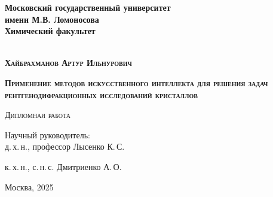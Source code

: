 \begin{titlepage}
\newpage

\begin{center}

\textbf{Московский государственный университет\\ имени М.В. Ломоносова}\\
\textbf{Химический факультет}\\
\\
\end{center}
\vspace{1cm}


\vspace{8em}
\begin{center}
\textsc{\textbf{Хайбрахманов Артур Ильнурович}}
\vspace{1cm}


\textsc{\textbf{\large Применение методов искусственного интеллекта для решения задач рентгенодифракционных исследований кристаллов}}


\vspace{1em}

\textsc{Дипломная работа}
\end{center}
\vspace{7em}
\begin{flushright}
Научный руководитель:\\

д.\,х.\,н., профессор Лысенко К.\,С.

к.\,х.\,н., с.\,н.\,с. Дмитриенко А.\,О.

\end{flushright}

\vspace{\fill}

\begin{center}
Москва, 2025
\end{center}

\end{titlepage}
